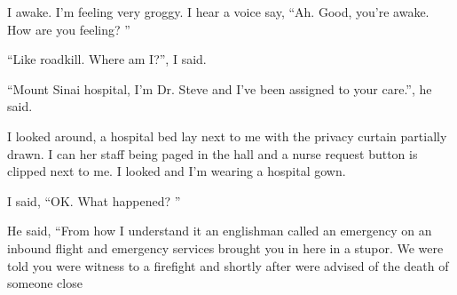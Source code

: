 I awake. I'm feeling very groggy. I hear a voice say, ``Ah. Good, you're awake. How are you feeling? ''

``Like roadkill. Where am I?'', I said.

``Mount Sinai hospital, I'm Dr. Steve and I've been assigned to your care.'', he said.

I looked around, a hospital bed lay next to me with the privacy curtain partially drawn. I can her staff being paged in the hall and a nurse request button is clipped next to me. I looked and I'm wearing a hospital gown.

I said, ``OK. What happened? ''

He said, ``From how I understand it an englishman called an emergency on an inbound flight and emergency services brought you in here in a stupor. We were told you were witness to a firefight and shortly after were advised of the death of someone close